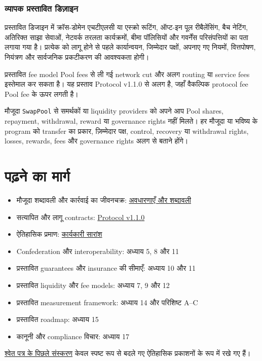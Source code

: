 \documentclass[11pt]{article}
\begin{document}
\subsubsection*{व्यापक प्रस्तावित डिज़ाइन}

प्रस्तावित डिजाइन में क्रॉस-डोमेन एचटीएलसी या एस्क्रो रूटिंग, ऑप्ट-इन पूल रीबैलेंसिंग, बैच नेटिंग, अतिरिक्त साझा सेवाओं, नेटवर्क तरलता कार्यक्रमों, बीमा पॉलिसियों और गवर्नेंस परिसंपत्तियों का पता लगाया गया है। प्रत्येक को लागू होने से पहले कार्यान्वयन, जिम्मेदार पक्षों, अपनाए गए नियमों, वित्तपोषण, नियंत्रण और सार्वजनिक प्रकटीकरण की आवश्यकता होगी।

प्रस्तावित fee model Pool fees से ली गई network cut और अलग routing या service fees इस्तेमाल कर सकता है। यह प्रस्ताव Protocol v1.1.0 से अलग है, जहाँ वैकल्पिक protocol fee Pool fee के ऊपर लगती है।

मौजूदा \texttt{SwapPool} से समर्थकों या liquidity providers को अपने आप Pool shares, repayment, withdrawal, reward या governance rights नहीं मिलते। हर मौजूदा या भविष्य के program को transfer का प्रकार, ज़िम्मेदार पक्ष, control, recovery या withdrawal rights, losses, rewards, fees और governance rights अलग से बताने होंगे।

\section*{पढ़ने का मार्ग}

\begin{itemize}[leftmargin=*]
\item मौजूदा शब्दावली और कार्रवाई का जीवनचक्र: \href{https://docs.cosmolocal.credit/hi/introduction/concepts}{अवधारणाएँ और शब्दावली}
\item सत्यापित और लागू contracts: \href{https://docs.cosmolocal.credit/hi/protocol/overview}{Protocol v1.1.0}
\item ऐतिहासिक प्रमाण: \href{https://docs.cosmolocal.credit/hi/white-paper/executive-summary}{कार्यकारी सारांश}
\item Confederation और interoperability: अध्याय 5, 8 और 11
\item प्रस्तावित guarantees और insurance की सीमाएँ: अध्याय 10 और 11
\item प्रस्तावित liquidity और fee models: अध्याय 7, 9 और 12
\item प्रस्तावित measurement framework: अध्याय 14 और परिशिष्ट A--C
\item प्रस्तावित roadmap: अध्याय 15
\item कानूनी और compliance विचार: अध्याय 17
\end{itemize}
\href{https://docs.cosmolocal.credit/hi/white-paper/archive}{श्वेत पत्र के पिछले संस्करण} केवल स्पष्ट रूप से बदले गए ऐतिहासिक प्रकाशनों के रूप में रखे गए हैं।
\end{document}
